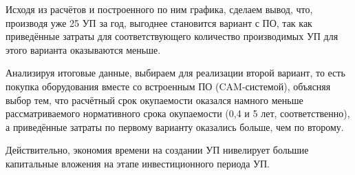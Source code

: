 Исходя из расчётов и построенного по ним графика, сделаем вывод, что, производя уже 25 УП за год, выгоднее становится вариант с ПО, так как приведённые затраты для соответствующего количество производимых УП для этого варианта оказываются меньше.

Анализируя итоговые данные, выбираем для реализации второй вариант, то есть покупка оборудования вместе со встроенным ПО (CAM-системой), объясняя выбор тем, что расчётный срок окупаемости оказался намного меньше рассматриваемого нормативного срока окупаемости (0,4 и 5 лет, соответственно), а приведённые затраты по первому варианту оказались больше, чем по второму.

Действительно, экономия времени на создании УП нивелирует большие капитальные вложения на этапе инвестиционного периода УП.


